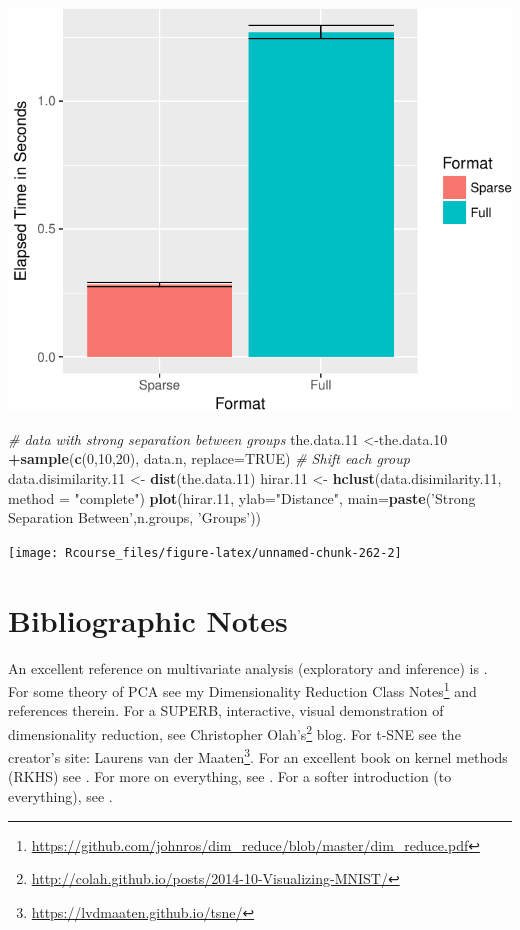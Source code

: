 \documentclass[]{book}
\newenvironment{Shaded}{\begin{snugshade}}{\end{snugshade}}
\newcommand{\CommentTok}[1]{\textcolor[rgb]{0.56,0.35,0.01}{\textit{#1}}}
\newcommand{\DataTypeTok}[1]{\textcolor[rgb]{0.13,0.29,0.53}{#1}}
\newcommand{\DecValTok}[1]{\textcolor[rgb]{0.00,0.00,0.81}{#1}}
\newcommand{\FloatTok}[1]{\textcolor[rgb]{0.00,0.00,0.81}{#1}}
\newcommand{\KeywordTok}[1]{\textcolor[rgb]{0.13,0.29,0.53}{\textbf{#1}}}
\newcommand{\NormalTok}[1]{#1}
\newcommand{\OperatorTok}[1]{\textcolor[rgb]{0.81,0.36,0.00}{\textbf{#1}}}
\newcommand{\OtherTok}[1]{\textcolor[rgb]{0.56,0.35,0.01}{#1}}
\newcommand{\StringTok}[1]{\textcolor[rgb]{0.31,0.60,0.02}{#1}}
\renewcommand{\href}[2]{#2\footnote{\url{#1}}}
\theoremstyle{definition}
\theoremstyle{definition}
\theoremstyle{definition}
\theoremstyle{remark}
\begin{document}
\includegraphics[width=0.5\linewidth]{Rcourse_files/figure-latex/unnamed-chunk-262-1}

\begin{Shaded}
\begin{Highlighting}[]
\CommentTok{# data with strong separation between groups}
\NormalTok{the.data}\FloatTok{.11}\NormalTok{ <-the.data}\FloatTok{.10} \OperatorTok{+}\KeywordTok{sample}\NormalTok{(}\KeywordTok{c}\NormalTok{(}\DecValTok{0}\NormalTok{,}\DecValTok{10}\NormalTok{,}\DecValTok{20}\NormalTok{), data.n, }\DataTypeTok{replace=}\OtherTok{TRUE}\NormalTok{) }\CommentTok{# Shift each group }
\NormalTok{data.disimilarity}\FloatTok{.11}\NormalTok{ <-}\StringTok{ }\KeywordTok{dist}\NormalTok{(the.data}\FloatTok{.11}\NormalTok{)}
\NormalTok{hirar}\FloatTok{.11}\NormalTok{ <-}\StringTok{ }\KeywordTok{hclust}\NormalTok{(data.disimilarity}\FloatTok{.11}\NormalTok{, }\DataTypeTok{method =} \StringTok{"complete"}\NormalTok{)}
\KeywordTok{plot}\NormalTok{(hirar}\FloatTok{.11}\NormalTok{, }\DataTypeTok{ylab=}\StringTok{"Distance"}\NormalTok{, }\DataTypeTok{main=}\KeywordTok{paste}\NormalTok{(}\StringTok{'Strong Separation Between'}\NormalTok{,n.groups, }\StringTok{'Groups'}\NormalTok{))}
\end{Highlighting}
\end{Shaded}

\texttt{[image: Rcourse\_files/figure-latex/unnamed-chunk-262-2]}

\hypertarget{bibliographic-notes-9}{%
\section{Bibliographic Notes}\label{bibliographic-notes-9}}

An excellent reference on multivariate analysis (exploratory and inference) is \citet{izenman2008modern}.
For some theory of PCA see my \href{https://github.com/johnros/dim_reduce/blob/master/dim_reduce.pdf}{Dimensionality Reduction Class Notes} and references therein.
For a SUPERB, interactive, visual demonstration of dimensionality reduction, see \href{http://colah.github.io/posts/2014-10-Visualizing-MNIST/}{Christopher Olah's} blog.
For t-SNE see the creator's site: \href{https://lvdmaaten.github.io/tsne/}{Laurens van der Maaten}.
For an excellent book on kernel methods (RKHS) see \citet{shawe2004kernel}.
For more on everything, see \citet{friedman2001elements}.
For a softer introduction (to everything), see \citet{james2013introduction}.
\end{document}
